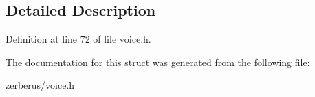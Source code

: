 \subsection{Detailed Description}


Definition at line 72 of file voice.\+h.



The documentation for this struct was generated from the following file\+:\begin{DoxyCompactItemize}
\item 
zerberus/voice.\+h\end{DoxyCompactItemize}
